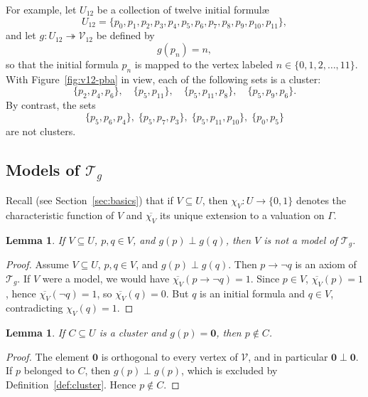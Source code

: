 \documentclass{article}   	%
\theoremstyle{plain}
\newtheorem{lemma}[theorem]{Lemma}
\theoremstyle{definition}
\theoremstyle{remark}
\begin{document}
For example, let $U_{12}$ be a collection of twelve initial formul\ae\
\[
U_{12}=\{p_0,p_1,p_2,p_3,p_4,p_5,p_6,p_7,p_8,p_9,p_{10},p_{11}\},
\]
and let $g:U_{12}\twoheadrightarrow\mathcal V_{12}$ be defined by
\begin{equation}
g(p_n)=n,
\label{spkl1}
\end{equation}
so that the initial formula $p_n$ is mapped to the vertex labeled $n\in\{0,1,2,\dots,11\}$.
With Figure~\ref{fig:v12-pba} in view, each of the following sets is a cluster:
\[
\{p_2,p_4,p_6\},\quad
\{p_5,p_{11}\},\quad
\{p_5,p_{11},p_8\},\quad
\{p_5,p_9,p_6\}.
\]
By contrast, the sets
\[
\{p_5,p_6,p_4\},\;
\{p_5,p_7,p_3\},\;
\{p_5,p_{11},p_{10}\},\;
\{p_0,p_5\}
\]
are not clusters.
\subsection{Models of $\mathcal T_g$}
\label{modA}

Recall (see Section~\ref{sec:basics}) that if $V \subseteq U$, then
$\chi_V : U \to \{0,1\}$ denotes the characteristic function of $V$ and
$\overline{\chi_V}$ its unique extension to a valuation on $\Gamma$.

\begin{lemma}
\label{lem:notmodel}
If $V \subseteq U$, $p,q \in V$, and $g(p) \perp g(q)$, then $V$ is \emph{not}
a model of\/ $\mathcal T_g$.
\end{lemma}

\begin{proof}
Assume $V \subseteq U$, $p,q \in V$, and $g(p) \perp g(q)$.
Then $p \to \neg q$ is an axiom of $\mathcal T_g$.
If $V$ were a model, we would have
$\overline{\chi_V}(p \to \neg q)=1$.
Since $p \in V$, $\overline{\chi_V}(p)=1$, hence
$\overline{\chi_V}(\neg q)=1$, so $\overline{\chi_V}(q)=0$.
But $q$ is an initial formula and $q \in V$, contradicting
$\chi_V(q)=1$.
\end{proof}

\begin{lemma}
\label{lem:zero}
If $C \subseteq U$ is a cluster and $g(p)=\mathbf 0$, then $p \notin C$.
\end{lemma}

\begin{proof}
The element $\mathbf 0$ is orthogonal to every vertex of $\mathcal V$, and in
particular $\mathbf 0\perp\mathbf 0$.  If $p$ belonged to $C$, then
$g(p)\perp g(p)$, which is excluded by Definition~\ref{def:cluster}.  Hence
$p\notin C$.
\end{proof}
\end{document}
